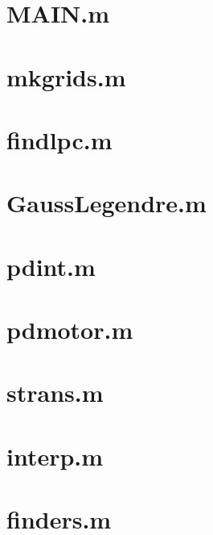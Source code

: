 \section{MAIN.m}
\label{sec:app1}




\section{mkgrids.m}
\label{sec:app2}



\section{findlpc.m}
\label{sec:app3}


\section{GaussLegendre.m}
\label{sec:app4}


\section{pdint.m}
\label{sec:app5}


\section{pdmotor.m}
\label{sec:app6}


\section{strans.m}
\label{sec:app7}


\section{interp.m}
\label{sec:app8}


\section{finders.m}
\label{sec:app9}



